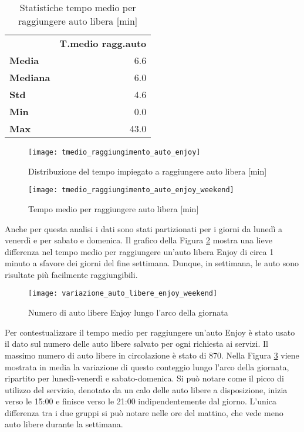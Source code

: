 \begin{table}[H]
	\centering
	\begin{tabular}{ | l r | }
		\hline
		& \textbf{T.medio ragg.auto} \\
		\textbf{Media}   &  6.6 \\
		\textbf{Mediana} &  6.0 \\
		\textbf{Std}     &  4.6 \\
		\textbf{Min}     &  0.0 \\ 
		\textbf{Max}     & 43.0 \\
		\hline
	\end{tabular}
	\caption{Statistiche tempo medio per raggiungere auto libera [min]}
	\label{table:4}
\end{table}

\begin{figure}[H]
	\centering
	\texttt{[image: tmedio\_raggiungimento\_auto\_enjoy]}
	\caption{Distribuzione del tempo impiegato a raggiungere auto libera [min]}
	\label{image:8}
\end{figure}

\begin{figure}[H]
\centering
\texttt{[image: tmedio\_raggiungimento\_auto\_enjoy\_weekend]}
\caption{Tempo medio per raggiungere auto libera [min]}
\label{image:21}
\end{figure}

Anche per questa analisi i dati sono stati partizionati per i giorni da lunedì a venerdì e per sabato e domenica. Il grafico della Figura \ref{image:21} mostra una lieve differenza nel tempo medio per raggiungere un'auto libera Enjoy di circa 1 minuto a sfavore dei giorni del fine settimana. Dunque, in settimana, le auto sono risultate più facilmente raggiungibili.

\begin{figure}[H]
\centering
\texttt{[image: variazione\_auto\_libere\_enjoy\_weekend]}
\caption{Numero di auto libere Enjoy lungo l'arco della giornata}
\label{image:9}
\end{figure}

Per contestualizzare il tempo medio per raggiungere un'auto Enjoy è stato usato il dato sul numero delle auto libere salvato per ogni richiesta ai servizi. Il massimo numero di auto libere in circolazione è stato di 870. Nella Figura \ref{image:9} viene mostrata in media la variazione di questo conteggio lungo l'arco della giornata, ripartito per lunedì-venerdì e sabato-domenica. Si può notare come il picco di utilizzo del servizio, denotato da un calo delle auto libere a disposizione, inizia verso le 15:00 e finisce verso le 21:00 indipendentemente dal giorno. L'unica differenza tra i due gruppi si può notare nelle ore del mattino, che vede meno auto libere durante la settimana.

